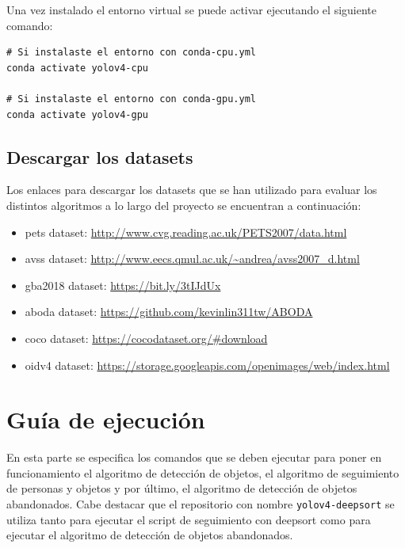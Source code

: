 Una vez instalado el entorno virtual se puede activar ejecutando el siguiente comando:

\vspace{0.5cm}

\begin{lstlisting}[language=iPython,caption=Activar entorno virtual de Anaconda,captionpos=b,label={lst:activar-env}]
# Si instalaste el entorno con conda-cpu.yml
conda activate yolov4-cpu

# Si instalaste el entorno con conda-gpu.yml
conda activate yolov4-gpu
\end{lstlisting}

\subsection{Descargar los datasets}
\label{subsec:descarga-datasets}

Los enlaces para descargar los datasets que se han utilizado para evaluar los distintos algoritmos a lo largo del proyecto se encuentran a continuación:

\begin{itemize}
    \item \gls{pets} dataset: \url{http://www.cvg.reading.ac.uk/PETS2007/data.html} \cite{pets2007-dataset}
    \item \gls{avss} dataset: \url{http://www.eecs.qmul.ac.uk/~andrea/avss2007_d.html} \cite{AVSSAB2007-dataset}
    \item \gls{gba2018} dataset: \url{https://bit.ly/3tIJdUx} \cite{gba-dataset}
    \item \gls{aboda} dataset: \url{https://github.com/kevinlin311tw/ABODA} \cite{aboda-dataset}
    \item \gls{coco} dataset: \url{https://cocodataset.org/#download} \cite{lin2015microsoft}
    \item \gls{oidv4} dataset: \url{https://storage.googleapis.com/openimages/web/index.html} \cite{Kuznetsova_2020}
    
\end{itemize}

\section{Guía de ejecución}
\label{sec:guia-ejecucion}

En esta parte se especifica los comandos que se deben ejecutar para poner en funcionamiento el algoritmo de detección de objetos, el algoritmo de seguimiento de personas y objetos y por último, el algoritmo de detección de objetos abandonados. Cabe destacar que el repositorio con nombre \texttt{yolov4-deepsort} se utiliza tanto para ejecutar el script de seguimiento con \gls{deepsort} como para ejecutar el algoritmo de detección de objetos abandonados.

